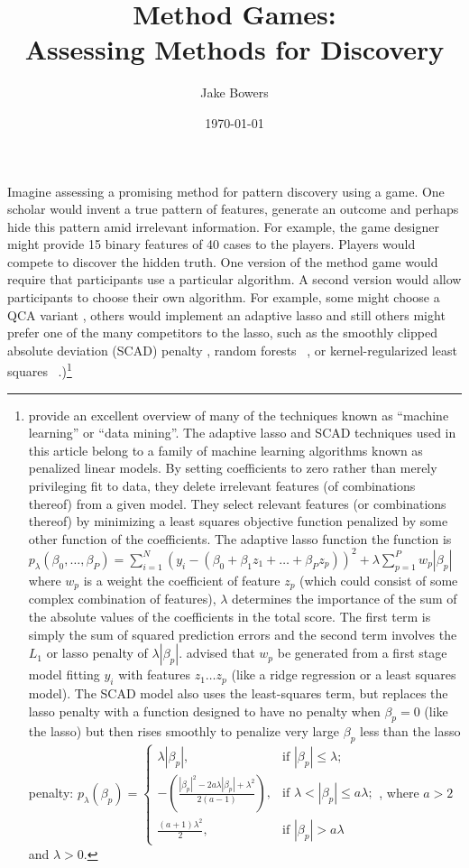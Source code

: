 \documentclass[12pt]{article}
\title{Method Games:\\ Assessing Methods for Discovery}
\author{Jake Bowers}
\date{\today}
\begin{document}
\maketitle

Imagine assessing a promising method for pattern discovery using a game.  One
scholar would invent a true pattern of features, generate an outcome and
perhaps hide this pattern amid irrelevant information.  For example, the game
designer might provide 15 binary features of 40 cases to the players. Players
would compete to discover the hidden truth.  One version of the method game
would require that participants use a particular algorithm. A second version
would allow participants to choose their own algorithm. For example, some
might choose a QCA variant \citep{rihoux2008configurational}, others would
implement an adaptive lasso \citep{zou2006adaptive} and still others might
prefer one of the many competitors to the lasso, such as the smoothly clipped
absolute deviation (SCAD) penalty \citep{fan2001variable}, random forests
~\citep{breiman2001random}, or kernel-regularized least squares
~\citep{hainmueller2012kernel}.)\footnote{\citet{hasttibfried09} provide an
  excellent overview of many of the techniques known as
  ``machine learning'' or ``data mining''. The adaptive lasso and SCAD
  techniques used in this article belong to a family of machine learning
  algorithms known as penalized linear models. By setting coefficients to
  zero rather than merely privileging fit to data, they delete irrelevant features (of combinations thereof) from a given
  model.  They select relevant features
  (or combinations thereof) by minimizing a least squares objective function
  penalized by some other function of the coefficients. The adaptive lasso
  function  the
  function is $p_{\lambda}(\beta_0, \ldots, \beta_P)=\sum_{i=1}^N (y_i - ( \beta_0 + \beta_1 z_1 + \ldots + \beta_P
  z_p) )^2 + \lambda \sum_{p=1}^P w_p|\beta_p|$ where $w_p$ is a weight the
  coefficient of feature $z_p$ (which could consist of some complex
  combination of features), $\lambda$ determines the importance of the sum of
  the absolute values of the coefficients in the total score. The first
  term is simply the sum of squared prediction errors and the second term
  involves the $L_1$ or lasso penalty of $\lambda|\beta_p|$. \citet{zou2006adaptive}
  advised that $w_p$ be generated from a first stage model fitting $y_i$ with
  features $z_1 \ldots z_p$ (like a ridge regression or a least squares
  model). The SCAD model also uses the least-squares term, but replaces the
  lasso penalty with a function designed to have no penalty when $\beta_p=0$
  (like the lasso) but then rises smoothly to penalize very large $\beta_p$ less than the
  lasso penalty: $p_{\lambda}(\beta_p)=\begin{cases}
    \lambda |\beta_p|, & \text{if } |\beta_p|\le \lambda; \\
    - \left( \frac{|\beta_p|^2 - 2 a \lambda |\beta_p| + \lambda^2}{2 (a-1)} \right), & \text{if } \lambda < |\beta_p| \le a \lambda; \\
    \frac{(a+1)\lambda^2}{2},  & \text{if } |\beta_p| > a \lambda 
  \end{cases}$, where $a > 2$ and $\lambda > 0$.
 }
 
\end{document}
